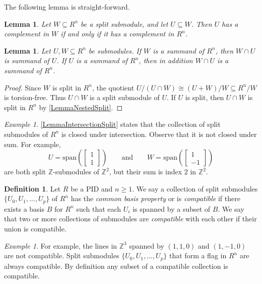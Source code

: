 \documentclass[a4paper]{amsart}
\newcommand{\Z}{\mathbb{Z}}
\numberwithin{theoremcounter}{section}
\newtheorem{lemma}[lemmaauto]{Lemma}
\theoremstyle{definition}
\newtheorem{definition}[Defauto]{Definition}
\theoremstyle{remark}
\newtheorem{example}[exampleauto]{Example}
\begin{document}
The following lemma is straight-forward. 
\begin{lemma} \label{LemmaNestedSplit} Let $W \subseteq R^n$ be a split submodule, and let $U \subseteq W$. Then $U$ has a complement in $W$ if and only if it has a complement in $R^n$. 
\end{lemma} 

\begin{lemma} \label{LemmaIntersectionSplit} Let $U,W \subseteq R^n$ be submodules. If $W$ is a summand of $R^n$, then $W \cap U$ is  summand of $U$.  If $U$ is a summand of $R^n$, then in addition $W \cap U$ is a summand of $R^n$. 
\end{lemma} 
\begin{proof} Since $W$ is split in $R^n$, the quotient $U / (U\cap W) \cong (U+W)/ W \subseteq R^n / W$ is torsion-free. Thus $U \cap W$ is a split submodule of $U$. If $U$ is split, then $U\cap W$ is split in $R^n$ by  \autoref{LemmaNestedSplit}. 
  \end{proof}
  
  \begin{example} \autoref{LemmaIntersectionSplit} states that the collection of split submodules of $R^n$ is closed under intersection. Observe that it is not closed under sum. For example, 
$$ U = \mathrm{span} \left( \begin{bmatrix} 1\\ 1 \end{bmatrix} \right)  \qquad \text{and} \qquad W = \mathrm{span} \left( \begin{bmatrix} 1\\-1 \end{bmatrix} \right)$$ are both split $\Z$-submodules of $\Z^2$, but their sum is index $2$ in $\Z^2$. 
  \end{example} 



\begin{definition} \label{DefnCompatible} Let $R$ be a PID and $n \geq 1$. We say a collection  of split submodules $\{U_0, U_1, \dots, U_p\}$  of $R^n$ has the \emph{common basis property} or is \emph{compatible} if there exists a basis $B$ for $R^n$ such that each $U_i$ is spanned by a subset of $B$.  We say that two or more collections of submodules are \emph{compatible} with each other if their union is compatible. 
\end{definition} 

\begin{example}
For example, the lines in $\Z^3$ spanned by $(1,1,0)$ and $(1, -1, 0)$ are not compatible. Split submodules $\{U_0, U_1, \dots, U_p\}$ that form a flag in $R^n$ are always compatible. By definition any subset of a compatible collection is compatible. 
\end{example}
\end{document}
